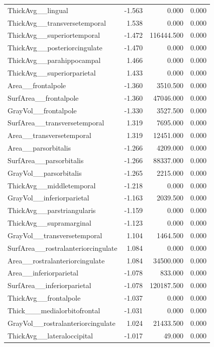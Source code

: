 \documentclass{article}
\begin{document}
\begin{longtable}{lrrr}
	ThickAvg\_\_lingual & -1.563 & 0.000 & 0.000 \\
	ThickAvg\_\_transversetemporal & 1.538 & 0.000 & 0.000 \\
	ThickAvg\_\_superiortemporal & -1.472 & 116444.500 & 0.000 \\
	ThickAvg\_\_posteriorcingulate & -1.470 & 0.000 & 0.000 \\
	ThickAvg\_\_parahippocampal & 1.466 & 0.000 & 0.000 \\
	ThickAvg\_\_superiorparietal & 1.433 & 0.000 & 0.000 \\
	Area\_\_frontalpole & -1.360 & 3510.500 & 0.000 \\
	SurfArea\_\_frontalpole & -1.360 & 47046.000 & 0.000 \\
	GrayVol\_\_frontalpole & -1.330 & 3527.500 & 0.000 \\
	SurfArea\_\_transversetemporal & 1.319 & 7695.000 & 0.000 \\
	Area\_\_transversetemporal & 1.319 & 12451.000 & 0.000 \\
	Area\_\_parsorbitalis & -1.266 & 4209.000 & 0.000 \\
	SurfArea\_\_parsorbitalis & -1.266 & 88337.000 & 0.000 \\
	GrayVol\_\_parsorbitalis & -1.265 & 2215.000 & 0.000 \\
	ThickAvg\_\_middletemporal & -1.218 & 0.000 & 0.000 \\
	GrayVol\_\_inferiorparietal & -1.163 & 2039.500 & 0.000 \\
	ThickAvg\_\_parstriangularis & -1.159 & 0.000 & 0.000 \\
	ThickAvg\_\_supramarginal & -1.123 & 0.000 & 0.000 \\
	GrayVol\_\_transversetemporal & 1.104 & 1464.500 & 0.000 \\
	SurfArea\_\_rostralanteriorcingulate & 1.084 & 0.000 & 0.000 \\
	Area\_\_rostralanteriorcingulate & 1.084 & 34500.000 & 0.000 \\
	Area\_\_inferiorparietal & -1.078 & 833.000 & 0.000 \\
	SurfArea\_\_inferiorparietal & -1.078 & 120187.500 & 0.000 \\
	ThickAvg\_\_frontalpole & -1.037 & 0.000 & 0.000 \\
	Thick\_\_\_medialorbitofrontal & -1.031 & 0.000 & 0.000 \\
	GrayVol\_\_rostralanteriorcingulate & 1.024 & 21433.500 & 0.000 \\
	ThickAvg\_\_lateraloccipital & -1.017 & 49.000 & 0.000 \\

\end{longtable}
\end{document}
